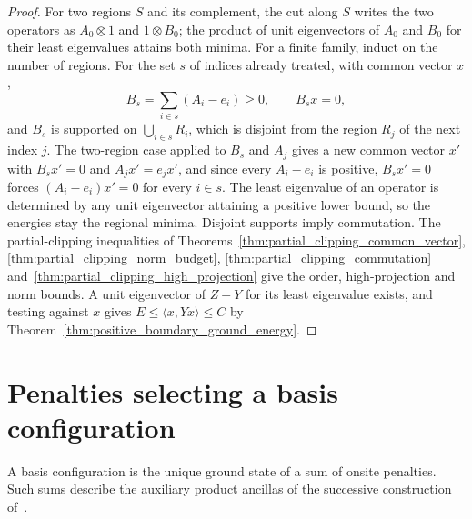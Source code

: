 \begin{proof}\leanok
    For two regions $S$ and its complement, the cut along $S$ writes the two
    operators as $A_0\otimes1$ and $1\otimes B_0$; the product of unit
    eigenvectors of $A_0$ and $B_0$ for their least eigenvalues attains both
    minima. For a finite family, induct on the number of regions. For the set $s$ of
    indices already treated, with common vector $x$,
    \[
        B_s=\sum_{i\in s}(A_i-e_i)\ge0,\qquad B_sx=0,
    \]
    and $B_s$ is supported on $\bigcup_{i\in s}R_i$, which is disjoint from the
    region $R_j$ of the next index $j$. The two-region case applied to $B_s$ and
    $A_j$ gives a new common vector $x'$ with $B_sx'=0$ and $A_jx'=e_jx'$, and since
    every $A_i-e_i$ is positive, $B_sx'=0$ forces $(A_i-e_i)x'=0$ for every
    $i\in s$.
    The least eigenvalue of an operator is determined by any unit eigenvector
    attaining a positive lower bound, so the energies stay the regional minima.
    Disjoint supports imply commutation. The partial-clipping inequalities of
    Theorems~\ref{thm:partial_clipping_common_vector},
    \ref{thm:partial_clipping_norm_budget}, \ref{thm:partial_clipping_commutation}
    and~\ref{thm:partial_clipping_high_projection} give the order, high-projection
    and norm bounds. A unit eigenvector of $Z+Y$ for its least eigenvalue exists,
    and testing against $x$ gives $E\le\langle x,Yx\rangle\le C$ by
    Theorem~\ref{thm:positive_boundary_ground_energy}.
\end{proof}

\section{Penalties selecting a basis configuration}
\label{sec:hamiltonians_product_basis_penalty}

A basis configuration is the unique ground state of a sum of onsite penalties. Such sums
describe the auxiliary product ancillas of the successive construction
of~\cite[lines 652--678]{Landau2013PolynomialTime}.


